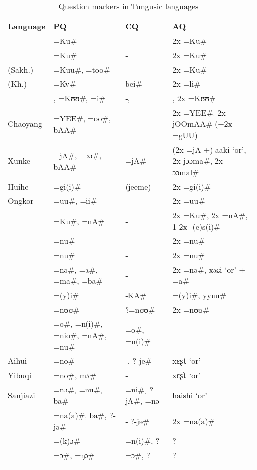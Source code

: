 \begin{table}
\caption{Question markers in Tungusic languages}
\label{tab:tungu:3}

\begin{tabularx}{\textwidth}{lllQ}
\lsptoprule

\textbf{Language} & \textbf{PQ} & \textbf{CQ} & \textbf{AQ}\\
\midrule
{} & =Ku\# & - & 2x =Ku\#\\
 & =Ku\# & - & 2x =Ku\#\\
 (Sakh.) & =Kuu\#, =too\# & - & 2x =Ku\#\\
 (Kh.) & =Kv\# & bei\# & 2x =li\#\\
 & , =Kʊʊ\#, =i\# & -,  & , 2x =Kʊʊ\#\\
Chaoyang  & =YEE\#, =oo\#, bAA\# & - & 2x =YEE\#, 2x jOOmAA\# (+2x =gUU)\\
Xunke  & =jA\#, =ɔɔ\#, bAA\# & =jA\# & (2x =jA +) aaki ‘or’, 2x jɔɔma\#, 2x ɔɔmal\#\\
Huihe  & =gi(i)\# & (jeeme) & 2x =gi(i)\#\\
Ongkor  & =uu\#, =ii\# & - & 2x =uu\#\\
 & =Ku\#, =nA\# & - & 2x =Ku\#, 2x =nA\#, 1-2x -(e)s(i)\#\\
 & =nu\# & - & 2x =nu\#\\
 & =nu\# & - & 2x =nu\#\\
 & =nə\#, =a\#, =ma\#, =ba\# & - & 2x =nə\#, xəɕi ‘or’ + =a\#\\
 & =(y)i\# & -KA\# & =(y)i\#, yyuu\#\\
 & =nʊʊ\# & ?=nʊʊ\# & 2x =nʊʊ\#\\
 & =o\#, =n(i)\#, =nio\#, =nA\#, =nu\# & =o\#, =n(i)\# & \\
Aihui  & =no\# & -, ?-je\# & xɛʂʅ ‘or’\\
Yibuqi  & =no\#, m\textsc{a}\# & - & xɛʂʅ ‘or’\\
Sanjiazi  & =nɔ\#, =nu\#, ba\# & =ni\#, ?-jA\#, =nə & haishi ‘or’\\
 & =na(a)\#, ba\#, ?-jə\# & - ?-jə\# & 2x =na(a)\#\\
 & =(k)ɔ\# & =n(i)\#, ? & ?\\
 & =ɔ\#, =ŋɔ\# & =ɔ\#, ? & ?\\
\lspbottomrule
\end{tabularx}
\end{table}

